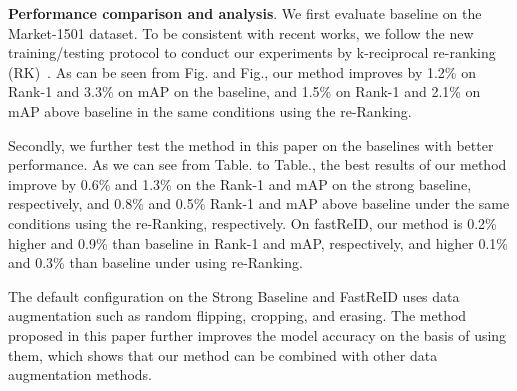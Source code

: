 \documentclass[10pt,twocolumn,letterpaper]{article}
\begin{document}
\textbf{Performance comparison and analysis}. We first evaluate  baseline \cite{zheng2018discriminatively} on the Market-1501 dataset\cite{market1501}. To be consistent with recent works, we follow the new training/testing protocol to conduct our experiments by k-reciprocal re-ranking (RK)~\cite{re_ranking}. As can be seen from Fig. and  Fig., our method improves by 1.2\% on Rank-1 and 3.3\% on mAP on the baseline, and 1.5\% on Rank-1 and 2.1\% on mAP above baseline in the same conditions using the re-Ranking\cite{re_ranking}. 


Secondly, we further test the method in this paper on the baselines\cite{stong_baseline,FastReID} with better performance. As we can see from Table. to Table., the best results of our method improve by 0.6\% and 1.3\% on the Rank-1 and mAP on the strong baseline\cite{stong_baseline}, respectively, and 0.8\% and 0.5\% Rank-1 and mAP above baseline under the same conditions using the re-Ranking\cite{re_ranking}, respectively. On fastReID\cite{FastReID}, our method is 0.2\% higher and 0.9\% than baseline in Rank-1 and mAP, respectively, and higher 0.1\% and 0.3\% than baseline under using re-Ranking. 

The default configuration on the Strong Baseline\cite{stong_baseline} and FastReID\cite{FastReID} uses data augmentation such as random flipping\cite{simonyan2014very}, cropping\cite{krizhevsky2012imagenet}, and erasing\cite{zhong2020random}. The method proposed in this paper further improves the model accuracy on the basis of using them, which shows that our method can be combined with other data augmentation methods.
\end{document}
